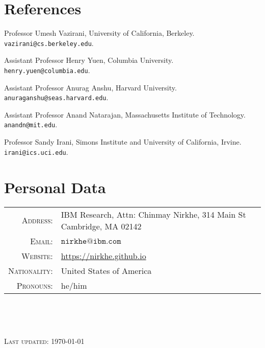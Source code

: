 \documentclass[11pt]{article}
\begin{document}
\section{References}
Professor Umesh Vazirani, University of California, Berkeley. \texttt{vazirani@cs.berkeley.edu}.

Assistant Professor Henry Yuen, Columbia University. \texttt{henry.yuen@columbia.edu}.

Assistant Professor Anurag Anshu, Harvard University. \texttt{anuraganshu@seas.harvard.edu}.

Assistant Professor Anand Natarajan, Massachusetts Institute of Technology. \texttt{anandn@mit.edu}.

Professor Sandy Irani, Simons Institute and University of California, Irvine. \texttt{irani@ics.uci.edu}.

\section{Personal Data}

\begin{tabular}{rl}
    \textsc{Address:}     & IBM Research, Attn: Chinmay Nirkhe, 314 Main St Cambridge, MA 02142 \\
    \textsc{Email:}       & $\mathtt{nirkhe@ibm.com}$ \\
    \textsc{Website:}     & \url{https://nirkhe.github.io} \\
    \textsc{Nationality:} & United States of America \\
    \textsc{Pronouns:}    & he/him \\
\end{tabular}

\

\

\textsc{Last updated: \today}
\end{document}
